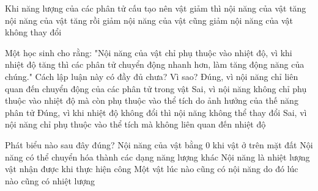 




\begin{ex}
	Khi năng lượng của các phân tử cấu tạo nên vật giảm thì
	\choice
	{nội năng của vật tăng}
	{nội năng của vật tăng rồi giảm}
	{\True nội năng của vật cũng giảm}
	{nội năng của vật không thay đổi}
	\end{ex}

\begin{ex} 
	Một học sinh cho rằng: "Nội năng của vật chỉ phụ thuộc vào nhiệt độ, vì khi nhiệt độ tăng thì các phân tử chuyển động nhanh hơn, làm tăng động năng của chúng." Cách lập luận này có đầy đủ chưa? Vì sao?
	\choice
	{Đúng, vì nội năng chỉ liên quan đến chuyển động của các phân tử trong vật}
	{\True Sai, vì nội năng không chỉ phụ thuộc vào nhiệt độ mà còn phụ thuộc vào thể tích do ảnh hưởng của thế năng phân tử}
	{Đúng, vì khi nhiệt độ không đổi thì nội năng không thể thay đổi}
	{Sai, vì nội năng chỉ phụ thuộc vào thể tích mà không liên quan đến nhiệt độ}
\end{ex}






\begin{ex} 
	Phát biểu nào sau đây đúng?
	\choice
	{Nội năng của vật bằng 0 khi vật ở trên mặt đất}
	{\True Nội năng có thể chuyển hóa thành các dạng năng lượng khác}
	{Nội năng là nhiệt lượng vật nhận được khi thực hiện công}
	{Một vật lúc nào cũng có nội năng do đó lúc nào cũng có nhiệt lượng}
\end{ex}

